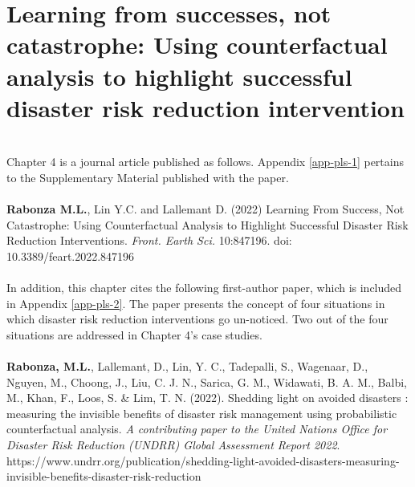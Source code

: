 \setcounter{chapter}{3}
\chapter[Learning from successes, not catastrophe: Using counterfactual analysis to highlight successful disaster risk reduction intervention]{Learning from successes, not catastrophe: Using counterfactual analysis to highlight successful disaster risk reduction intervention}\label{chap-counterfactual}

\begin{small}
\\
Chapter 4 is a journal article published as follows. Appendix \ref{app-pls-1} pertains to the Supplementary Material published with the paper.
\\ \\
\noindent
    \textbf{Rabonza M.L.}, Lin Y.C. and Lallemant D. (2022) Learning From Success, Not Catastrophe: Using Counterfactual Analysis to Highlight Successful Disaster Risk Reduction Interventions. \textit{Front. Earth Sci.} 10:847196. doi: 10.3389/feart.2022.847196
\\
\\
In addition, this chapter cites the following first-author paper, which is included in Appendix \ref{app-pls-2}. The paper presents the concept of four situations in which disaster risk reduction interventions go un-noticed. Two out of the four situations are addressed in Chapter 4's case studies.
\\
\\
\noindent
\textbf{Rabonza, M.L.}, Lallemant,  D.,  Lin,  Y. C., Tadepalli,  S., Wagenaar,  D., Nguyen,  M., Choong,  J., Liu,  C. J. N., Sarica,  G. M., Widawati,  B. A. M., Balbi,  M., Khan,  F., Loos,  S. \& Lim,  T. N. (2022). Shedding light on avoided disasters : measuring the invisible benefits of disaster risk management using probabilistic counterfactual analysis. \textit{A contributing paper to the United Nations Office for Disaster Risk Reduction (UNDRR) Global Assessment Report 2022}. https://www.undrr.org/publication/shedding-light-avoided-disasters-measuring-invisible-benefits-disaster-risk-reduction




\end{small}
